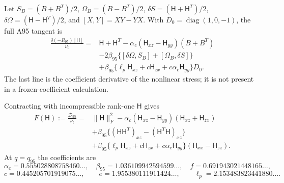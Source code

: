 \documentclass[11pt,a4paper]{article}
\numberwithin{equation}{section}
\newcommand{\nut}{\nu_t}
\DeclareMathOperator{\diag}{diag}
\begin{document}
Let $S_B=(B+B^T)/2$, $\Omega_B=(B-B^T)/2$,
$\delta S=(\mathsf H+\mathsf H^T)/2$,
$\delta\Omega=(\mathsf H-\mathsf H^T)/2$, and
$[X,Y]=XY-YX$. With $D_0=\diag(1,0,-1)$, the full A95 tangent is
\begin{equation}
 \begin{aligned}
 \frac{\delta(-R_{95})[\mathsf H]}{\nut}
 ={}&\mathsf H+\mathsf H^T
 -\alpha_c(\mathsf H_{xz}-\mathsf H_{yy})(B+B^T)\\
 &-2\beta_{95}\{[\delta\Omega,S_B]+[\Omega_B,\delta S]\}\\
 &+\beta_{95}\{\ell_p\mathsf H_{xz}
              +c\mathsf H_{zx}+c\alpha_c\mathsf H_{yy}\}D_0 .
 \end{aligned}
 \label{st:a95-tangent}
\end{equation}
The last line is the coefficient derivative of the nonlinear stress;
it is not present in a frozen-coefficient calculation.

Contracting with incompressible rank-one $\mathsf H$ gives
\begin{equation}
 \begin{aligned}
 F(\mathsf H):=\frac{\mathcal D_{95}}{\nut}
 ={}&\|\mathsf H\|_F^2
 -\alpha_c(\mathsf H_{xz}-\mathsf H_{yy})
                       (\mathsf H_{xz}+\mathsf H_{zx})\\
 &+\beta_{95}\{(\mathsf H\mathsf H^T)_{xz}
                      -(\mathsf H^T\mathsf H)_{xz}\}\\
 &+\beta_{95}\{\ell_p\mathsf H_{xz}
              +c\mathsf H_{zx}+c\alpha_c\mathsf H_{yy}\}
                    (\mathsf H_{xx}-\mathsf H_{zz}).
 \end{aligned}
 \label{st:a95-rank-one}
\end{equation}
At $q=q_{95}$ the coefficients are
\[
 \alpha_c=0.555028808758460\ldots,\quad
 \beta_{95}=1.036109942594599\ldots,\quad
 f=0.691943021448165\ldots,
\]
\[
 c=0.445205701919075\ldots,\qquad
 e=1.955380111911424\ldots,\qquad
 \ell_p=2.153483823441880\ldots .
\]
\end{document}
